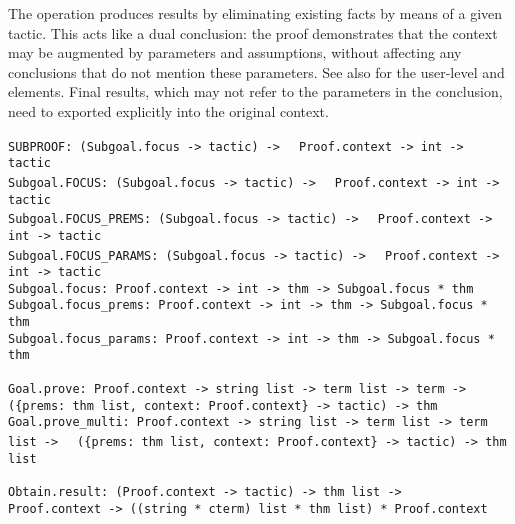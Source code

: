 \begin{isabellebody}
\begin{isamarkuptext}
  The  operation produces results by eliminating
  existing facts by means of a given tactic.  This acts like a dual
  conclusion: the proof demonstrates that the context may be augmented
  by parameters and assumptions, without affecting any conclusions
  that do not mention these parameters.  See also
  \cite{isabelle-isar-ref} for the user-level \hyperlink{command.obtain}{\mbox{}} and
  \hyperlink{command.guess}{\mbox{}} elements.  Final results, which may not refer to
  the parameters in the conclusion, need to exported explicitly into
  the original context.%
\end{isamarkuptext}%
\isamarkuptrue%
%
\isadelimmlref
%
\endisadelimmlref
%
\isatagmlref
%
\begin{isamarkuptext}%
\begin{mldecls}
  \verb|SUBPROOF: (Subgoal.focus -> tactic) ->|\isasep\isanewline%
\verb|  Proof.context -> int -> tactic| \\
  \verb|Subgoal.FOCUS: (Subgoal.focus -> tactic) ->|\isasep\isanewline%
\verb|  Proof.context -> int -> tactic| \\
  \verb|Subgoal.FOCUS_PREMS: (Subgoal.focus -> tactic) ->|\isasep\isanewline%
\verb|  Proof.context -> int -> tactic| \\
  \verb|Subgoal.FOCUS_PARAMS: (Subgoal.focus -> tactic) ->|\isasep\isanewline%
\verb|  Proof.context -> int -> tactic| \\
  \verb|Subgoal.focus: Proof.context -> int -> thm -> Subgoal.focus * thm| \\
  \verb|Subgoal.focus_prems: Proof.context -> int -> thm -> Subgoal.focus * thm| \\
  \verb|Subgoal.focus_params: Proof.context -> int -> thm -> Subgoal.focus * thm| \\
  \end{mldecls}

  \begin{mldecls}
  \verb|Goal.prove: Proof.context -> string list -> term list -> term ->|\isasep\isanewline%
\verb|  ({prems: thm list, context: Proof.context} -> tactic) -> thm| \\
  \verb|Goal.prove_multi: Proof.context -> string list -> term list -> term list ->|\isasep\isanewline%
\verb|  ({prems: thm list, context: Proof.context} -> tactic) -> thm list| \\
  \end{mldecls}
  \begin{mldecls}
  \verb|Obtain.result: (Proof.context -> tactic) -> thm list ->|\isasep\isanewline%
\verb|  Proof.context -> ((string * cterm) list * thm list) * Proof.context| \\
  \end{mldecls}


\end{isamarkuptext}
\end{isabellebody}
